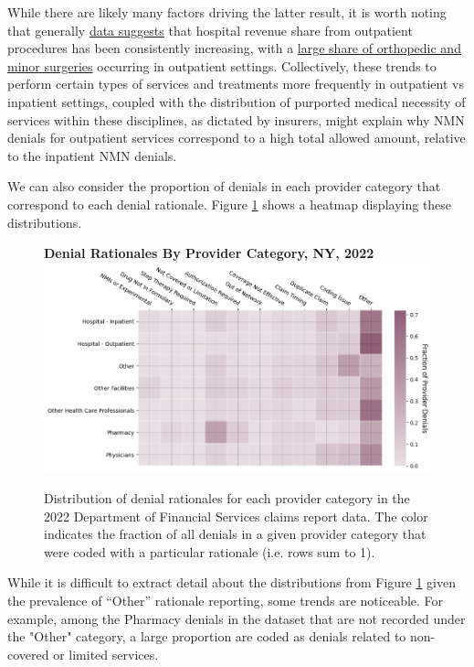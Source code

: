 \documentclass[12pt, a4paper,twoside]{report}
\theoremstyle{plain} %
\theoremstyle{definition} %
\theoremstyle{remark} %
\numberwithin{equation}{chapter}
\begin{document}
	
		While there are likely many factors driving the latter result, it is worth noting that generally \href{https://www2.deloitte.com/us/en/insights/industry/health-care/outpatient-virtual-health-care-trends.html}{data suggests} that hospital revenue share from outpatient procedures has been consistently increasing, with a \href{https://www.mckinsey.com/industries/healthcare/our-insights/walking-out-of-the-hospital-the-continued-rise-of-ambulatory-care-and-how-to-take-advantage-of-it}{large share of orthopedic and minor surgeries} occurring in outpatient settings. Collectively, these trends to perform certain types of services and treatments more frequently in outpatient vs inpatient settings, coupled with the distribution of purported medical necessity of services within these disciplines, as dictated by insurers, might explain why NMN denials for outpatient services correspond to a high total allowed amount, relative to the inpatient NMN denials.
		
		We can also consider the proportion of denials in each provider category that correspond to each denial rationale. Figure \ref{nyrationalesbyprovidercat} shows a heatmap displaying these distributions.
		
		
		\begin{figure}[h!]
			\centering
			\textbf{Denial Rationales By Provider Category, NY, 2022}
			\includegraphics[width=\columnwidth]{images/ny_claim_reports/provider_cat_vs_denial_cat.png}
			\caption{Distribution of denial rationales for each provider category in the 2022 Department of Financial Services claims report data. The color indicates the fraction of all denials in a given provider category that were coded with a particular rationale (i.e. rows sum to 1).}
			\label{nyrationalesbyprovidercat}
		\end{figure}
	
		While it is difficult to extract detail about the distributions from Figure \ref{nyrationalesbyprovidercat} given the prevalence of ``Other'' rationale reporting, some trends are noticeable. For example, among the Pharmacy denials in the dataset that are not recorded under the "Other" category, a large proportion are coded as denials related to non-covered or limited services.
		
\end{document}

